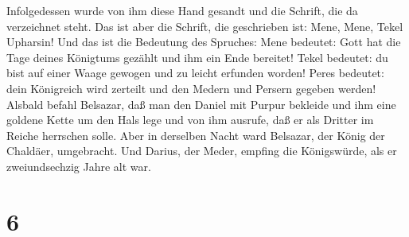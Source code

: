 Infolgedessen wurde von ihm diese Hand gesandt und die Schrift, die da
verzeichnet steht.  Das ist aber die Schrift, die
geschrieben ist: Mene, Mene, Tekel Upharsin!  Und das ist
die Bedeutung des Spruches: Mene bedeutet: Gott hat die Tage deines
Königtums gezählt und ihm ein Ende bereitet!  Tekel
bedeutet: du bist auf einer Waage gewogen und zu leicht erfunden worden!
 Peres bedeutet: dein Königreich wird zerteilt und den
Medern und Persern gegeben werden!  Alsbald befahl
Belsazar, daß man den Daniel mit Purpur bekleide und ihm eine goldene
Kette um den Hals lege und von ihm ausrufe, daß er als Dritter im Reiche
herrschen solle.  Aber in derselben Nacht ward Belsazar,
der König der Chaldäer, umgebracht.  Und Darius, der
Meder, empfing die Königswürde, als er zweiundsechzig Jahre alt war.

\hypertarget{section-5}{%
\section{6}\label{section-5}}

